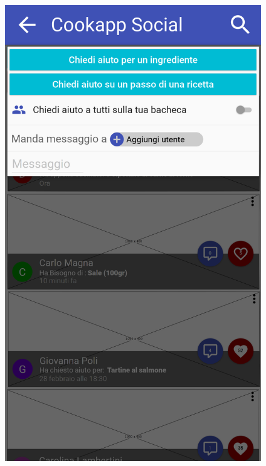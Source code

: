 \begin{figure}[H]
\begin{minipage}{.49\textwidth}
		\includegraphics[width=\textwidth]{img/wireframe/chiedi_aiuto_social_messaggio.png}
	\end{minipage}
\end{figure}
